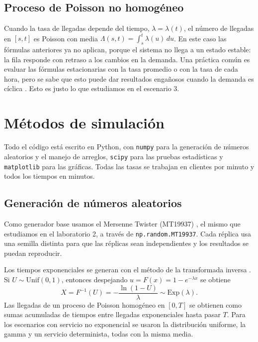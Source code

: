 \documentclass[11pt,letterpaper]{article}
\begin{document}
\subsection{Proceso de Poisson no homogéneo}
Cuando la tasa de llegadas depende del tiempo, $\lambda = \lambda(t)$, el número de
llegadas en $[s,t]$ es Poisson con media $\Lambda(s,t) = \int_s^t \lambda(u)\,du$. En este
caso las fórmulas anteriores ya no aplican, porque el sistema no llega a un estado
estable: la fila responde con retraso a los cambios en la demanda. Una práctica común es
evaluar las fórmulas estacionarias con la tasa promedio o con la tasa de cada hora, pero
se sabe que esto puede dar resultados engañosos cuando la demanda es cíclica
\cite{green}. Esto es justo lo que estudiamos en el escenario 3.

\section{Métodos de simulación}
Todo el código está escrito en Python, con \texttt{numpy} para la generación de números
aleatorios y el manejo de arreglos, \texttt{scipy} para las pruebas estadísticas y
\texttt{matplotlib} para las gráficas. Todas las tasas se trabajan en clientes por minuto
y todos los tiempos en minutos.

\subsection{Generación de números aleatorios}
Como generador base usamos el Mersenne Twister (MT19937) \cite{mt}, el mismo que
estudiamos en el laboratorio 2, a través de \texttt{np.random.MT19937}. Cada réplica
usa una semilla distinta para que las réplicas sean independientes y los resultados se
puedan reproducir.

Los tiempos exponenciales se generan con el método de la transformada inversa
\cite{ross}. Si $U \sim \text{Unif}(0,1)$, entonces despejando $u = F(x) = 1-e^{-\lambda x}$
se obtiene
\begin{equation}
  X = F^{-1}(U) = -\frac{\ln(1-U)}{\lambda} \sim \text{Exp}(\lambda).
\end{equation}
Las llegadas de un proceso de Poisson homogéneo en $[0,T]$ se obtienen como sumas
acumuladas de tiempos entre llegadas exponenciales hasta pasar $T$. Para los escenarios
con servicio no exponencial se usaron la distribución uniforme, la gamma y un servicio
determinista, todas con la misma media.
\end{document}
